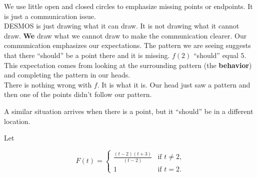\documentclass{ximera}
\begin{document}
\begin{image}
\end{image}


We use little open and closed circles to emphasize missing points or endpoints.  It is just a communication issue. \\




DESMOS is just drawing what it can draw.  It is not drawing what it cannot draw. \textbf{We} draw what we cannot draw to make the communication clearer. Our communication emphasizes our expectations. The pattern we are seeing suggests that there ``should'' be a point there and it is missing. $f(2)$ ``should'' equal $5$.  This expectation comes from looking at the surrounding pattern (the \textbf{\textcolor{purple!85!blue}{behavior}}) and completing the pattern in our heads. \\

There is nothing wrong with $f$.  It is what it is.  Our head just saw a pattern and then one of the points didn't follow our pattern.


A similar situation arrives when there is a point, but it ``should'' be in a different location.







Let 


\[
F(t) = 
\begin{cases}
  \frac{(t-2)(t+3)}{(t-2)} &\text{if $t \ne 2$,}\\
  1 &\text{if $t = 2$}.
\end{cases}
\]
\end{document}
